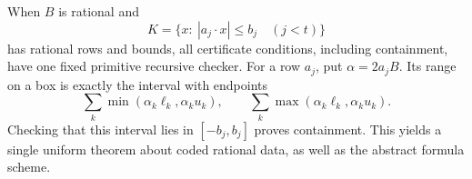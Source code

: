 When \(B\) is rational and
\begin{equation}\label{eq:slab}
 K=\{x:\ |a_j\cdot x|\leq b_j\quad(j<t)\}
\end{equation}
has rational rows and bounds, all certificate conditions, including
containment, have one fixed primitive recursive checker.
For a row \(a_j\), put \(\alpha=2a_jB\). Its range on a box is exactly
the interval with endpoints
\[
 \sum_k\min(\alpha_k\ell_k,\alpha_k u_k),
 \qquad
 \sum_k\max(\alpha_k\ell_k,\alpha_k u_k).
\]
Checking that this interval lies in \([-b_j,b_j]\) proves containment.
This yields a single uniform theorem about coded rational data,
as well as the abstract formula scheme.
